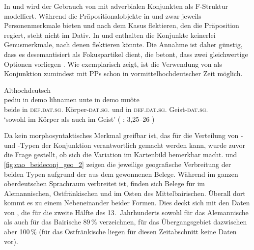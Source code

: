 In  und 
wird der Gebrauch von  mit adverbialen Konjunkten als F-Struktur
modelliert. Während die Präpositionalobjekte in  und
 zwar jeweils Personenmerkmale bieten und nach dem
Kasus flektieren, den die Präposition regiert, steht  nicht im
Dativ. In  und  enthalten die
Konjunkte keinerlei Genusmerkmale, nach denen  flektieren könnte.
Die Annahme ist daher günstig, dass es desemantisiert als Fokuspartikel dient,
die betont, dass zwei gleichwertige Optionen vorliegen
\autocite[425--428]{johannessen2005}. Wie 
exemplarisch zeigt, ist die Verwendung von  als Konjunktion
zumindest mit PPs schon in vormittelhochdeutscher Zeit
möglich.

\begin{exe}
\ex \label{ex:beideintiahd_3_copy}
	\langinfo%
		{Althochdeutsch}
		{}
		{\cite[171]{steinmeyer1916}}\\
	\gll pediu in demo lihnamen unte in demo muôte \\
		beide in \textsc{def.dat.sg.\MascI} Körper-\textsc{dat.sg.\MascI} und in
			\textsc{def.dat.sg.\MascI} Geist-\textsc{dat.sg.\MascI} \\
	\trans `sowohl im Körper als auch im Geist'
		(%
			: 3,25--26
		)
\end{exe}

Da kein morphosyntaktisches Merkmal greifbar ist, das für die Verteilung von
- und -Typen der Konjunktion verantwortlich gemacht
werden kann, wurde zuvor die Frage gestellt, ob sich die Variation im
Kartenbild bemerkbar macht.
 und \ref{fig:cao_beideconj_geo_2} zeigen die
jeweilige geografische Verbreitung der beiden Typen aufgrund der aus dem \CAO{}
gewonnenen Belege. Während  im ganzen oberdeutschen Sprachraum
verbreitet ist, finden sich Belege für  im
Alemannischen, Ostfränkischen und im Osten des
Mittelbairischen. Überall dort kommt es zu einem Nebeneinander beider Formen.
Dies deckt sich mit den Daten von \citet[627]{ksw2}, die für die zweite Hälfte
des 13.~Jahrhunderts sowohl für das Alemannische
als auch für das Bairische 89\,\%  verzeichnen, für das
Übergangsgebiet dazwischen aber 100\,\% (für das Ostfränkische liegen für
diesen Zeitabschnitt keine Daten vor).

